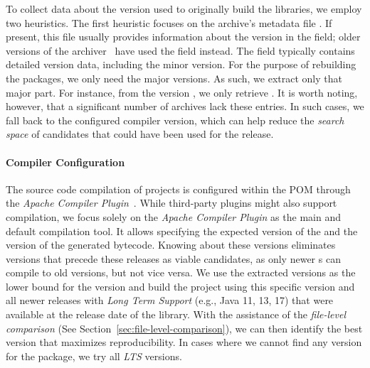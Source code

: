 \documentclass[smallextended]{svjour3}
\newcommand{\secref}[1]{Section~\ref{sec:#1}}
\newcommand{\maven}[1]{\tool{Maven{#1}}}
\newcommand{\java}{\tool{Java}}
\begin{document}
To collect data about the  version used to originally build the libraries, we employ two heuristics. The first heuristic focuses on the archive's metadata file .
If present, this file usually provides information about the  version in the  field; older versions of the \maven{} archiver~\cite{jdkManifestReplaceJira,jdkManifestReplaceGithub} have used the  field instead. The  field typically contains detailed version data, including the minor version. For the purpose of rebuilding the packages, we only need the major versions. As such, we extract only that major part. For instance, from the version , we only retrieve . It is worth noting, however, that a significant number of archives lack these entries. In such cases, we fall back to the configured compiler version, which can help reduce the \emph{search space} of  candidates that could have been used for the release.

\paragraph{Compiler Configuration}

The source code compilation of \maven{} projects is configured within the POM through the \emph{Apache \maven{} Compiler Plugin}~\cite{mavenPlugin}.
While third-party plugins might also support compilation, we focus solely on the \emph{Apache \maven{} Compiler Plugin} as the main and default compilation tool.
It allows specifying the expected version of the \java{}  and the  version of the generated bytecode. Knowing about these versions eliminates  versions that precede these releases as viable candidates, as only newer s can compile to old versions, but not vice versa. We use the extracted versions as the lower bound for the  version and build the project using this specific version and all newer releases with \emph{Long Term Support} (e.g., Java 11, 13, 17) that were available at the release date of the library. With the assistance of the \emph{file-level comparison} (See \secref{file-level-comparison}), we can then identify the best version that maximizes reproducibility. In cases where we cannot find any version for the package, we try all \emph{LTS} versions.
\end{document}
